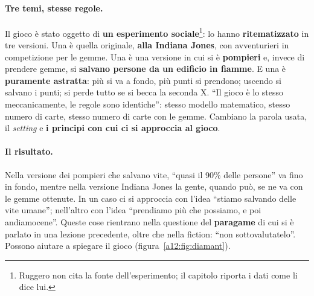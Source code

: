 \paragraph{Tre temi, stesse regole.} Il gioco è stato oggetto di \textbf{un esperimento
sociale}\footnote{Ruggero non cita la fonte dell'esperimento; il capitolo riporta i dati
come li dice lui.}: lo hanno \textbf{ritematizzato} in tre versioni. Una è quella
originale, \textbf{alla Indiana Jones}, con avventurieri in competizione per le gemme.
Una è una versione in cui si è \textbf{pompieri} e, invece di prendere gemme, si
\textbf{salvano persone da un edificio in fiamme}. E una è \textbf{puramente astratta}:
più si va a fondo, più punti si prendono; uscendo si salvano i punti; si perde tutto se
si becca la seconda X. ``Il gioco è lo stesso meccanicamente, le regole sono
identiche'': stesso modello matematico, stesso numero di carte, stesso numero di carte
con le gemme. Cambiano la parola usata, il \emph{setting} e \textbf{i principi con cui ci
si approccia al gioco}.

\paragraph{Il risultato.} Nella versione dei pompieri che salvano vite, ``quasi il 90\%
delle persone'' va fino in fondo, mentre nella versione Indiana Jones la gente, quando
può, se ne va con le gemme ottenute. In un caso ci si approccia con l'idea ``stiamo
salvando delle vite umane''; nell'altro con l'idea ``prendiamo più che possiamo, e poi
andiamocene''. Queste cose rientrano nella questione del \textbf{paragame} di cui si è
parlato in una lezione precedente, oltre che nella fiction: ``non sottovalutatelo''.
Possono aiutare a spiegare il gioco (figura~\ref{a12:fig:diamant}).

